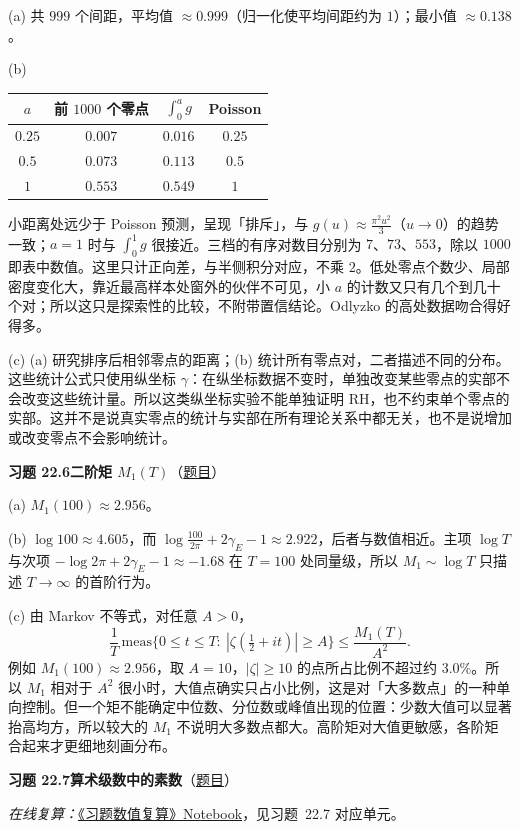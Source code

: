 \documentclass[11pt,a4paper]{article}
\newcommand{\Sol}[2]{%
  \par\addvspace{1.2em}\noindent
  \hypertarget{s:#1}{}\textbf{习题 #1\quad #2}\hfill{\small（\hyperlink{q:#1}{题目}）}\par
  \nopagebreak\smallskip}
\begin{document}
(a) 共 $999$ 个间距，平均值 $\approx0.999$（归一化使平均间距约为 $1$）；最小值 $\approx0.138$。

(b)
\begin{center}
\small
\begin{tabular}{@{}cccc@{}}
\toprule
$a$ & 前 $1000$ 个零点 & $\int_0^ag$ & Poisson \\
\midrule
$0.25$ & $0.007$ & $0.016$ & $0.25$ \\
$0.5$ & $0.073$ & $0.113$ & $0.5$ \\
$1$ & $0.553$ & $0.549$ & $1$ \\
\bottomrule
\end{tabular}
\end{center}
小距离处远少于 Poisson 预测，呈现「排斥」，与 $g(u)\approx\frac{\pi^2u^2}3$（$u\to0$）的趋势一致；$a=1$ 时与 $\int_0^1g$ 很接近。三档的有序对数目分别为 $7$、$73$、$553$，除以 $1000$ 即表中数值。这里只计正向差，与半侧积分对应，不乘 $2$。低处零点个数少、局部密度变化大，靠近最高样本处窗外的伙伴不可见，小 $a$ 的计数又只有几个到几十个对；所以这只是探索性的比较，不附带置信结论。Odlyzko 的高处数据吻合得好得多。

(c) (a) 研究排序后相邻零点的距离；(b) 统计所有零点对，二者描述不同的分布。这些统计公式只使用纵坐标 $\gamma$：在纵坐标数据不变时，单独改变某些零点的实部不会改变这些统计量。所以这类纵坐标实验不能单独证明 RH，也不约束单个零点的实部。这并不是说真实零点的统计与实部在所有理论关系中都无关，也不是说增加或改变零点不会影响统计。

\Sol{22.6}{二阶矩 $M_1(T)$}
(a) $M_1(100)\approx2.956$。

(b) $\log100\approx4.605$，而 $\log\frac{100}{2\pi}+2\gamma_E-1\approx2.922$，后者与数值相近。主项 $\log T$ 与次项 $-\log2\pi+2\gamma_E-1\approx-1.68$ 在 $T=100$ 处同量级，所以 $M_1\sim\log T$ 只描述 $T\to\infty$ 的首阶行为。

(c) 由 Markov 不等式，对任意 $A>0$，
\[
  \frac1T\,\mathrm{meas}\bigl\{0\le t\le T:\ |\zeta(\tfrac12+it)|\ge A\bigr\}\le\frac{M_1(T)}{A^2}.
\]
例如 $M_1(100)\approx2.956$，取 $A=10$，$|\zeta|\ge10$ 的点所占比例不超过约 $3.0\%$。所以 $M_1$ 相对于 $A^2$ 很小时，大值点确实只占小比例，这是对「大多数点」的一种单向控制。但一个矩不能确定中位数、分位数或峰值出现的位置：少数大值可以显著抬高均方，所以较大的 $M_1$ 不说明大多数点都大。高阶矩对大值更敏感，各阶矩合起来才更细地刻画分布。

\Sol{22.7}{算术级数中的素数}
\emph{在线复算：}\href{https://colab.research.google.com/github/lichengtong123/lichengtong-RH/blob/main/\%E4\%B9\%A0\%E9\%A2\%98\%E4\%B8\%8E\%E8\%A7\%A3\%E7\%AD\%94/\%E4\%B9\%A0\%E9\%A2\%98\%E6\%95\%B0\%E5\%80\%BC\%E5\%A4\%8D\%E7\%AE\%97.ipynb}{《习题数值复算》Notebook}，见习题~22.7 对应单元。
\end{document}
